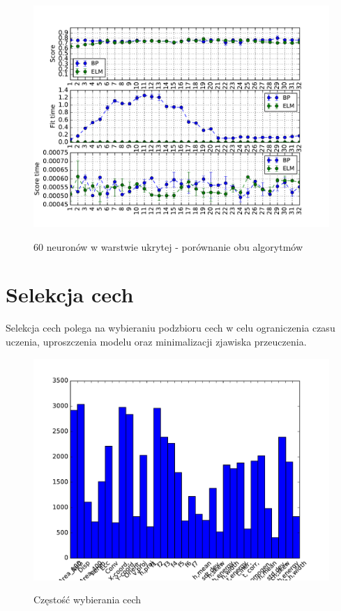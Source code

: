 \begin{figure}[h!]
	\centering
	\includegraphics[width=\linewidth]{img/bp_elm_60.pdf}
	\label{Rysunek}
	\caption{60 neuronów w warstwie ukrytej - porównanie obu algorytmów}
\end{figure}

\section{Selekcja cech}
Selekcja cech polega na wybieraniu podzbioru cech w celu ograniczenia czasu uczenia, uproszczenia modelu oraz minimalizacji zjawiska przeuczenia.
\begin{figure}[h!]
	\centering
	\includegraphics[width=\linewidth]{img/features.pdf}
	\label{Rysunek}
	\caption{Częstość wybierania cech}
\end{figure}

